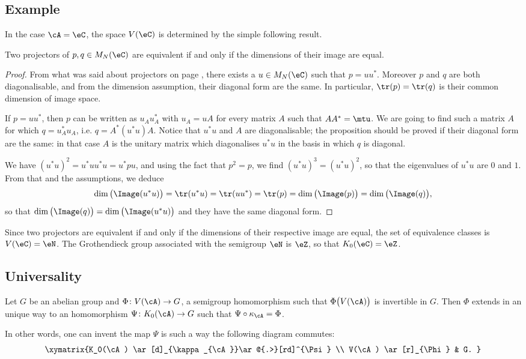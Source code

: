 \subsection{Example}

In the case $\cA=\eC$, the space $V(\eC)$ is determined by the simple following result.
\begin{proposition}
	Two projectors of $p,q\in M_N(\eC)$ are equivalent if and only if the dimensions of their image are equal.
\end{proposition}

\begin{proof}
	From what was said about projectors on page \pageref{PgProjPositif} , there exists a $u\in M_N(\eC)$ such that $p=uu^*$. Moreover $p$ and $q$ are both diagonalisable, and from the dimension assumption, their diagonal form are the same. In particular, $\tr(p)=\tr(q)$ is their common dimension of image space.

	If $p=uu^*$, then $p$ can be written as $u_Au_A^*$ with $u_A=uA$ for every matrix $A$ such that $AA^*=\mtu$. We are going to find such a matrix $A$ for which $q=u_A^*u_A$, i.e. $q=A^*(u^*u)A$. Notice that $u^*u$ and $A$ are diagonalisable; the proposition should be proved if their diagonal form are the same: in that case $A$ is the unitary matrix which diagonalises $u^*u$ in the basis in which $q$ is diagonal.

	We have $(u^*u)^2=u^*uu^*u=u^*pu$, and using the fact that $p^2=p$, we find $(u^*u)^3=(u^*u)^2$, so that the eigenvalues of $u^*u$ are $0$ and $1$. From that and the assumptions, we deduce
	\[
		\dim\big( \Image(u^*u) \big)=\tr(u^*u)=\tr(uu^*)=\tr(p)=\dim\big( \Image(p) \big)=\dim\big( \Image(q) \big),
	\]
	so that $\dim\big( \Image(q) \big)=\dim\big( \Image(u^*u)\big)$ and they have the same diagonal form.
\end{proof}

Since two projectors are equivalent if and only if the dimensions of their respective image are equal, the set of equivalence classes is $V(\eC)=\eN$. The Grothendieck group associated with the semigroup $\eN$ is $\eZ$, so that $K_0(\eC)=\eZ$.

\subsection{Universality}

\begin{proposition}
	Let $G$ be an abelian group and $\Phi\colon V(\cA)\to G$, a semigroup homomorphism such that $\Phi\big( V(\cA) \big)$ is invertible in $G$. Then $\Phi$ extends in an unique way to an homomorphism $\Psi\colon K_0(\cA)\to G$ such that $\Psi\circ\kappa_{\cA}=\Phi$.
\end{proposition}
In other words, one can invent the map $\Psi$ is such a way the following diagram commutes:
\[
	\xymatrix{%
	K_0(\cA) \ar[d]_{\kappa_{\cA}}\ar@{.>}[rd]^{\Psi}		\\
	V(\cA) \ar[r]_{\Phi}	&	G.
	}
\]

